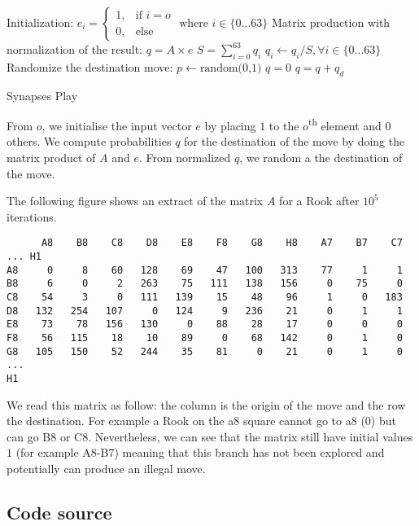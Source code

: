 \documentclass[a4paper,10pt]{article}
\begin{document}
\begin{algorithm}
  \label{alg:SynapsesPlay}
  \DontPrintSemicolon
  Initialization:\;
  $e_i =
  \begin{cases}
    1,& \text{if } i = o \\
    0,& \text{else}
  \end{cases} \text{ where } i \in \{0 \dotsc 63\}$\;
  Matrix production with normalization of the result:\;
  $q = A \times e$\;
  $S = \sum_{i=0}^{63}q_i$\;
  $q_i \gets q_i / S, \forall i \in \{0 \dotsc 63\}$\;
  Randomize the destination move:\;
  $p \gets \text{random(0,1)}$\;
  $q = 0$\;
  {
    $q = q + q_d$\;
       {
       }
  }
  \caption{Synapses Play}
\end{algorithm}

From $o$, we initialise the input vector $e$ by placing $1$ to the
$o$\textsuperscript{th} element and 0 others. We compute probabilities $q$ for
the destination of the move by doing the matrix product of $A$ and $e$. From
normalized $q$, we random a the destination of the move.

The following figure shows an extract of the matrix $A$ for a Rook after $10^5$
iterations.

\begin{verbatim}
      A8    B8    C8    D8    E8    F8    G8    H8    A7    B7    C7 ... H1
A8     0     8    60   128    69    47   100   313    77     1     1
B8     6     0     2   263    75   111   138   156     0    75     0
C8    54     3     0   111   139    15    48    96     1     0   183
D8   132   254   107     0   124     9   236    21     0     1     1
E8    73    78   156   130     0    88    28    17     0     0     0
F8    56   115    18    10    89     0    68   142     0     1     0
G8   105   150    52   244    35    81     0    21     0     1     0
...
H1
\end{verbatim}

We read this matrix as follow: the column is the origin of the move and the row
the destination. For example a Rook on the a8 square cannot go to a8 (0) but can
go B8 or C8. Nevertheless, we can see that the matrix still have initial values
$1$ (for example A8-B7) meaning that this branch has not been explored and
potentially can produce an illegal move.

\subsection*{Code source}
\end{document}
